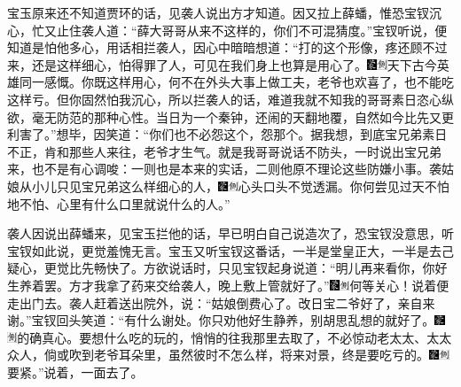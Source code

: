 宝玉原来还不知道贾环的话，见袭人说出方才知道。因又拉上薛蟠，惟恐宝钗沉心，忙又止住袭人道：“薛大哥哥从来不这样的，你们不可混猜度。”宝钗听说，便知道是怕他多心，用话相拦袭人，因心中暗暗想道：“打的这个形像，疼还顾不过来，还是这样细心，怕得罪了人，可见在我们身上也算是用心了。{\includegraphics[width=3mm]{../Images/00006}\includegraphics[width=3mm]{../Images/00011}\footnotesize \kaishu 天下古今英雄同一感慨。}你既这样用心，何不在外头大事上做工夫，老爷也欢喜了，也不能吃这样亏。但你固然怕我沉心，所以拦袭人的话，难道我就不知我的哥哥素日恣心纵欲，毫无防范的那种心性。当日为一个秦钟，还闹的天翻地覆，自然如今比先又更利害了。”想毕，因笑道：“你们也不必怨这个，怨那个。据我想，到底宝兄弟素日不正，肯和那些人来往，老爷才生气。就是我哥哥说话不防头，一时说出宝兄弟来，也不是有心调唆：一则也是本来的实话，二则他原不理论这些防嫌小事。袭姑娘从小儿只见宝兄弟这么样细心的人，{\includegraphics[width=3mm]{../Images/00006}\includegraphics[width=3mm]{../Images/00011}\footnotesize \kaishu 心头口头不觉透漏。}你何尝见过天不怕地不怕、心里有什么口里就说什么的人。”

袭人因说出薛蟠来，见宝玉拦他的话，早已明白自己说造次了，恐宝钗没意思，听宝钗如此说，更觉羞愧无言。宝玉又听宝钗这番话，一半是堂皇正大，一半是去己疑心，更觉比先畅快了。方欲说话时，只见宝钗起身说道：“明儿再来看你，你好生养着罢。方才我拿了药来交给袭人，晚上敷上管就好了。”{\includegraphics[width=3mm]{../Images/00006}\includegraphics[width=3mm]{../Images/00011}\footnotesize \kaishu 何等关心！}说着便走出门去。袭人赶着送出院外，说：“姑娘倒费心了。改日宝二爷好了，亲自来谢。”宝钗回头笑道：“有什么谢处。你只劝他好生静养，别胡思乱想的就好了。{\includegraphics[width=3mm]{../Images/00006}\includegraphics[width=3mm]{../Images/00011}\footnotesize \kaishu 的确真心。}要想什么吃的玩的，悄悄的往我那里去取了，不必惊动老太太、太太众人，倘或吹到老爷耳朵里，虽然彼时不怎么样，将来对景，终是要吃亏的。{\includegraphics[width=3mm]{../Images/00006}\includegraphics[width=3mm]{../Images/00011}\footnotesize \kaishu 要紧。}”说着，一面去了。

